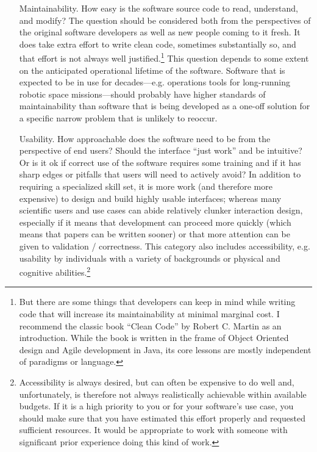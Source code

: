 \documentclass[12pt,oneside]{book}
\begin{document}
\begin{itemize}[wide, labelwidth=!, labelindent=0pt, font=\bfseries]
\item[Maintainability.] How easy is the software source code to read, understand, and modify? The question should be considered both from the perspectives of the original software developers as well as new people coming to it fresh. It does take extra effort to write clean code, sometimes substantially so, and that effort is not always well justified.\footnote{But there are some things that developers can keep in mind while writing code that will increase its maintainability at minimal marginal cost. I recommend the classic book ``Clean Code'' by Robert C. Martin as an introduction. While the book is written in the frame of Object Oriented design and Agile development in Java, its core lessons are mostly independent of paradigms or language.
} This question depends to some extent on the anticipated operational lifetime of the software. Software that is expected to be in use for decades---e.g. operations tools for long-running robotic space missions---should probably have higher standards of maintainability than software that is being developed as a one-off solution for a specific narrow problem that is unlikely to reoccur.

\item[Usability.] How approachable does the software need to be from the perspective of end users? Should the interface ``just work'' and be intuitive? Or is it ok if correct use of the software requires some training and if it has sharp edges or pitfalls that users will need to actively avoid? In addition to requiring a specialized skill set, it is more work (and therefore more expensive) to design and build highly usable interfaces; whereas many scientific users and use cases can abide relatively clunker interaction design, especially if it means that development can proceed more quickly (which means that papers can be written sooner) or that more attention can be given to validation / correctness. This category also includes accessibility, e.g. usability by individuals with a variety of backgrounds or physical and cognitive abilities.\footnote{Accessibility is always desired, but can often be expensive to do well and, unfortunately, is therefore not always realistically achievable within available budgets. If it is a high priority to you or for your software's use case, you should make sure that you have estimated this effort properly and requested sufficient resources. It would be appropriate to work with someone with significant prior experience doing this kind of work.}


\end{itemize}
\end{document}
